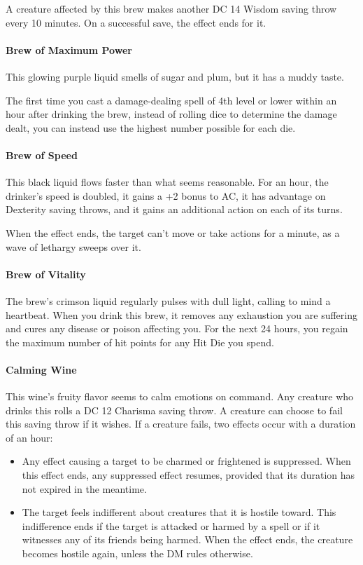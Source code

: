     A creature affected by this brew makes another DC 14 Wisdom saving throw every 10 minutes.
    On a successful save, the effect ends for it.
\paragraph{Brew of Maximum Power}
    This glowing purple liquid smells of sugar and plum, but it has a muddy taste.

    The first time you cast a damage-dealing spell of 4th level or lower within an hour after drinking the brew, instead of rolling dice to determine the damage dealt, you can instead use the highest number possible for each die.
\paragraph{Brew of Speed} %
    This black liquid flows faster than what seems reasonable.
    For an hour, the drinker's speed is doubled, it gains a +2 bonus to AC, it has advantage on Dexterity saving throws, and it gains an additional action on each of its turns.

    When the effect ends, the target can't move or take actions for a minute, as a wave of lethargy sweeps over it.
\paragraph{Brew of Vitality} %
    The brew's crimson liquid regularly pulses with dull light, calling to mind a heartbeat.
    When you drink this brew, it removes any exhaustion you are suffering and cures any disease or poison affecting you.
    For the next 24 hours, you regain the maximum number of hit points for any Hit Die you spend.
\paragraph{Calming Wine} %
    This wine's fruity flavor seems to calm emotions on command.
    Any creature who drinks this rolls a DC 12 Charisma saving throw.
    A creature can choose to fail this saving throw if it wishes.
    If a creature fails, two effects occur with a duration of an hour:
    \begin{itemize}
        \item Any effect causing a target to be charmed or frightened is suppressed.
        When this effect ends, any suppressed effect resumes, provided that its duration has not expired in the meantime.
        \item The target feels indifferent about creatures that it is hostile toward.
        This indifference ends if the target is attacked or harmed by a spell or if it witnesses any of its friends being harmed.
        When the effect ends, the creature becomes hostile again, unless the DM rules otherwise.
    \end{itemize}


